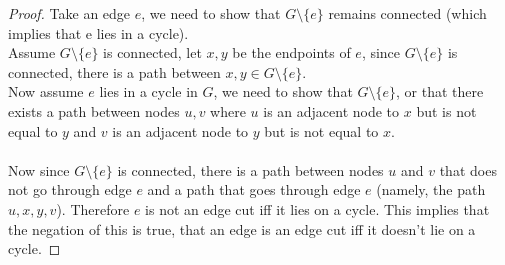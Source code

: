 \documentclass[12pt]{article}
\begin{document}
\begin{proof}
	Take an edge $e$, we need to show that $G\setminus \{ e \}$ remains connected (which implies that e lies in a cycle).\\
	Assume $G \setminus \{ e \}$ is connected, let $x,y$ be the endpoints of $e$, since $G \setminus \{ e \}$ is connected, there is a path between $x,y \in G \setminus \{ e \}$.\\
	Now assume $e$ lies in a cycle in $G$, we need to show that $G \setminus \{ e \}$, or that there exists a path between nodes $u,v$ where $u$ is an adjacent node to $x$ but is not equal to $y$ and $v$ is an adjacent node to $y$ but is not equal to $x$.\\
	\\
	Now since $G \setminus \{ e \}$ is connected, there is a path between nodes $u$ and $v$ that does not go through edge $e$ and a path that goes through edge $e$ (namely, the path $u,x,y,v$). Therefore $e$ is not an edge cut iff it lies on a cycle. This implies that the negation of this is true, that an edge is an edge cut iff it doesn't lie on a cycle.
\end{proof}
\end{document}
